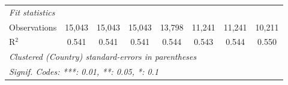 \begin{tabular}{lccccccc}
   \midrule \emph{Fit statistics}\\
   Observations                                                                         & 15,043  & 15,043  & 15,043       & 13,798        & 11,241      & 11,241       & 10,211\\  
   R$^2$                                                                                & 0.541   & 0.541   & 0.541        & 0.544         & 0.543       & 0.544        & 0.550\\  
   \midrule
   \multicolumn{8}{l}{\emph{Clustered (Country) standard-errors in parentheses}}\\
   \multicolumn{8}{l}{\emph{Signif. Codes: ***: 0.01, **: 0.05, *: 0.1}}\\
\end{tabular}
\par\endgroup


